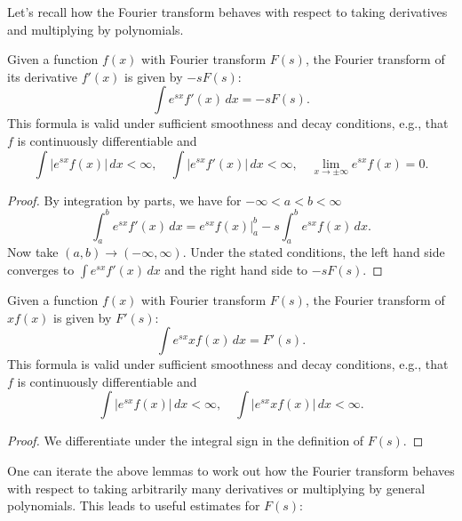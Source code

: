 \documentclass[reqno]{amsart} 
\begin{document}
Let's recall how the Fourier transform behaves with respect to taking derivatives and multiplying by polynomials.
\begin{lemma}\label{lemma:cj4und9jny}
  Given a function $f(x)$ with Fourier transform $F(s)$, the Fourier transform of its derivative $f'(x)$ is given by $-s F(s)$:
  \begin{equation*}
    \int e^{s x} f' (x) \, d x = -s F (s).
  \end{equation*}
  This formula is valid under sufficient smoothness and decay conditions, e.g., that $f$ is continuously differentiable and
  \begin{equation*}
    \int \left\lvert e^{s x } f (x) \right\rvert \, d x  <\infty ,
    \quad 
    \int \left\lvert e^{s x } f ' (x) \right\rvert \, d x < \infty,
    \quad
    \lim_{x \rightarrow \pm \infty} e^{s x} f(x) =0.
  \end{equation*}
\end{lemma}
\begin{proof}
  By integration by parts, we have for $- \infty < a < b < \infty$
  \begin{equation*}
    \int_a^b e^{s x } f ' (x) \, d x =
    e^{s x } f(x) \vert_a^b - s \int_a^b e^{s x } f(x) \, d x.
  \end{equation*}
  Now take $(a,b) \rightarrow (-\infty,\infty)$.  Under the stated conditions, the left hand side converges to $\int e^{s x } f' (x) \, d x$ and the right hand side to $- s F(s)$.
\end{proof}
\begin{lemma}
  Given a function $f(x)$ with Fourier transform $F(s)$, the Fourier transform of $x f(x)$ is given by $F'(s)$:
  \begin{equation*}
    \int e^{s x } x f (x) \, d x = F'(s).
  \end{equation*}
  This formula is valid under sufficient smoothness and decay conditions, e.g., that $f$ is continuously differentiable and
  \begin{equation*}
    \int \left\lvert e^{s x } f (x) \right\rvert \, d x  <\infty ,
    \quad 
    \int \left\lvert e^{s x } x f (x) \right\rvert \, d x < \infty.
  \end{equation*}
\end{lemma}
\begin{proof}
  We differentiate under the integral sign in the definition of $F(s)$.
\end{proof}
One can iterate the above lemmas to work out how the Fourier transform behaves with respect to taking arbitrarily many derivatives or multiplying by general polynomials.  This leads to useful estimates for $F(s)$:
\end{document}
